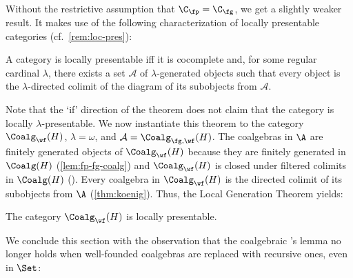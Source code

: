 Without the restrictive assumption that $\C_\fp=\C_\fg$, we get a slightly weaker result. It makes use of the following characterization of locally presentable categories (cf.\ \autoref{rem:loc-pres}):

\begin{theorem} A category is locally presentable iff it is cocomplete and, for some regular cardinal $\lambda$, there exists a set $\mathcal{A}$ of $\lambda$-generated objects such that every object is the $\lambda$-directed colimit of the diagram of its subobjects from $\mathcal{A}$. 
\end{theorem}

Note that the `if' direction of the theorem does not claim that the category is locally $\lambda$-presentable. We now instantiate this theorem to the category $\Coalg_\wf(H)$, $\lambda=\omega$, and $\mathcal{A}=\Coalg_{\fg,\wf}(H)$. The coalgebras in $\A$ are finitely generated objects of $\Coalg_\wf(H)$ because they are finitely generated in $\Coalg(H)$ (\autoref{lem:fp-fg-coalg}) and  $\Coalg_\wf(H)$ is closed under filtered colimits in $\Coalg(H)$ (). Every coalgebra in $\Coalg_\wf(H)$ is the directed colimit of its subobjects from $\A$ (\autoref{thm:koenig}). Thus, the Local Generation Theorem yields:

\begin{corollary}[\smash{\injmono}, \hpresint]
The category $\Coalg_\wf(H)$ is locally presentable.
\end{corollary}
We conclude this section with the observation that the coalgebraic \Konig's lemma no longer holds when well-founded coalgebras are replaced with recursive ones, even in $\Set$:

